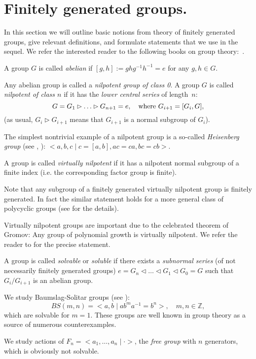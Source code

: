 \section{Finitely generated groups.}

In this section we will outline basic notions from theory of finitely generated groups,
give relevant definitions, and formulate statements that we use in the
sequel. We refer the interested reader to the following books on group theory:~\cite{Bech, BrHaef, PdH, Kur}.

A group $G$ is called \textit{abelian} if $[g,h]:=ghg^{-1}h^{-1}=e$ for any $g,h\in G$.

\begin{defin}
Any abelian group is called a \textit{nilpotent group of class 0}.
A group $G$ is called \textit{nilpotent of class $n$} if it has the \textit{lower central series} of length~$n$:
\begin{equation}\notag
\label{nilpdef}
G=G_1\rhd \ldots\rhd G_{n+1}=e,\quad\mbox{where }G_{i+1}=[G_i,G],
\end{equation}
(as usual, $G_i\rhd G_{i+1}$ means that $G_{i+1}$ is a normal subgroup of $G_i$).
\end{defin}

The simplest nontrivial example of a nilpotent group is a so-called \textit{Heisenberg group} (see \cite{PdH}, \cite{Kur}): $<a,b,c\mid c=[a,b], ac=ca,bc=cb>$.

\begin{defin}
A group is called \textit{virtually nilpotent} if it has a nilpotent normal subgroup of a finite index (i.e. the corresponding factor group is finite).
\end{defin}

\begin{remark}\label{remFinGen}
Note that any subgroup of a finitely generated virtually nilpotent group is finitely generated. In fact the similar statement holds for a more general class of polycyclic groups (see \cite{BrHaef, Seg} for the details).
\end{remark}

Virtually nilpotent groups are important due to the celebrated theorem of Gromov: Any group of polynomial growth is virtually nilpotent. We refer the reader to \cite{Gromov} for the precise statement.


\begin{defin}
A group is called \textit{solvable} or \textit{soluble} if there exists a \textit{subnormal series} (of not necessarily finitely generated groups) $e=G_n\lhd\ldots\lhd G_1\lhd G_0=G$ such that $G_i/G_{i+1}$ is an abelian group. %
\end{defin}

We study Baumslag-Solitar groups (see \cite{PdH}):
$$
BS(m,n)=<a,b\mid ab^ma^{-1}=b^n>,\quad m,n\in\mathbb{Z},
$$
which are solvable for $m=1$. These groups are well known in group theory as a source of numerous counterexamples.

We study actions of $F_n=<a_1,\ldots,a_n\mid\cdot>$, the \textit{free group} with $n$ generators, which is obviously not solvable.

